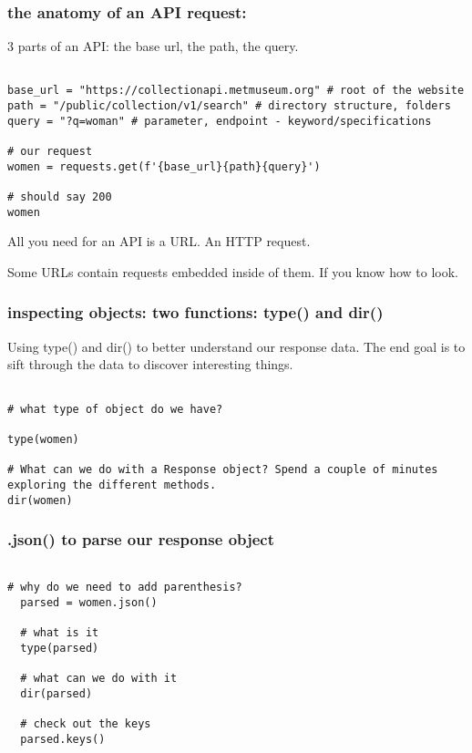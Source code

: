 \documentclass[11pt]{article}
\begin{document}
\subsubsection{the anatomy of an API request:}
\label{sec:orgcb1d5f9}

3 parts of an API: the base url, the path, the query.

\begin{verbatim}

base_url = "https://collectionapi.metmuseum.org" # root of the website
path = "/public/collection/v1/search" # directory structure, folders
query = "?q=woman" # parameter, endpoint - keyword/specifications

# our request
women = requests.get(f'{base_url}{path}{query}')

# should say 200
women

\end{verbatim}

All you need for an API is a URL. An HTTP request. 

Some URLs contain requests embedded inside of them. If you know how to
look.

\subsubsection{inspecting objects: two functions: type() and dir()}
\label{sec:orgf5e4e97}

Using type() and dir() to better understand our response data. The end
goal is to sift through the data to discover interesting things.

\begin{verbatim}

# what type of object do we have?

type(women)

# What can we do with a Response object? Spend a couple of minutes exploring the different methods.
dir(women)

\end{verbatim}

\subsubsection{.json() to parse our response object}
\label{sec:org141a67a}

\begin{verbatim}

# why do we need to add parenthesis? 
  parsed = women.json()

  # what is it
  type(parsed)

  # what can we do with it
  dir(parsed)

  # check out the keys
  parsed.keys()

\end{verbatim}
\end{document}
